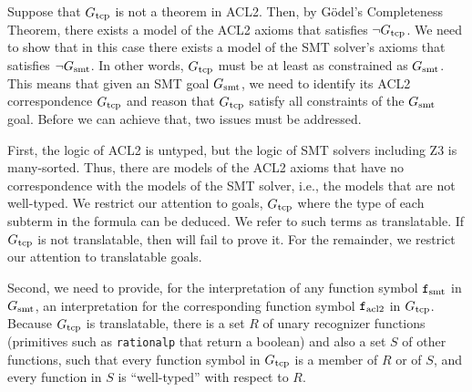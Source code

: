 Suppose that $G_{\mathrm{tcp}}$ is not a theorem in ACL2.  Then, by G\"{o}del's
Completeness Theorem, there exists a model of the ACL2 axioms that satisfies
$\neg G_{\mathrm{tcp}}$. We need to show that in this case there exists a model of the
\acs{SMT} solver's axioms that satisfies $\neg G_{\mathrm{smt}}$.
In other words, $G_{\mathrm{tcp}}$ must be at least as constrained as $G_{\mathrm{smt}}$. This means
that given an \acs{SMT} goal $G_{\mathrm{smt}}$, we need to identify its ACL2
correspondence $G_{\mathrm{tcp}}$ and reason that $G_{\mathrm{tcp}}$ satisfy all constraints of the
$G_{\mathrm{smt}}$ goal.
Before we can achieve that, two issues must be addressed.

First, the logic of ACL2 is untyped, but the logic of \acs{SMT} solvers
including Z3 is many-sorted. Thus, there are models of the ACL2
axioms that have no correspondence with the models of the \acs{SMT} solver,
i.e., the models that are not well-typed. We restrict our attention to goals,
$G_{\mathrm{tcp}}$ where the type of each subterm in the formula can be deduced.
We refer to such terms as translatable. If $G_{\mathrm{tcp}}$ is not translatable, then
\smtlink{} will fail to prove it. For the remainder, we restrict our attention
to translatable goals.

Second, we need to provide, for the interpretation of any function symbol
$\mathtt{f}_{\mathrm{smt}}$ in $G_{\mathrm{smt}}$, an interpretation for the corresponding function symbol
$\mathtt{f}_{\mathrm{acl2}}$ in $G_{\mathrm{tcp}}$.
Because $G_{\mathrm{tcp}}$ is translatable, there is a set $R$ of unary recognizer functions
(primitives such as \texttt{rationalp} that return a boolean) and also a set $S$
of other functions, such that every function symbol in $G_{\mathrm{tcp}}$ is a member of $R$
or of $S$, and every function in $S$ is ``well-typed'' with respect to $R$.

